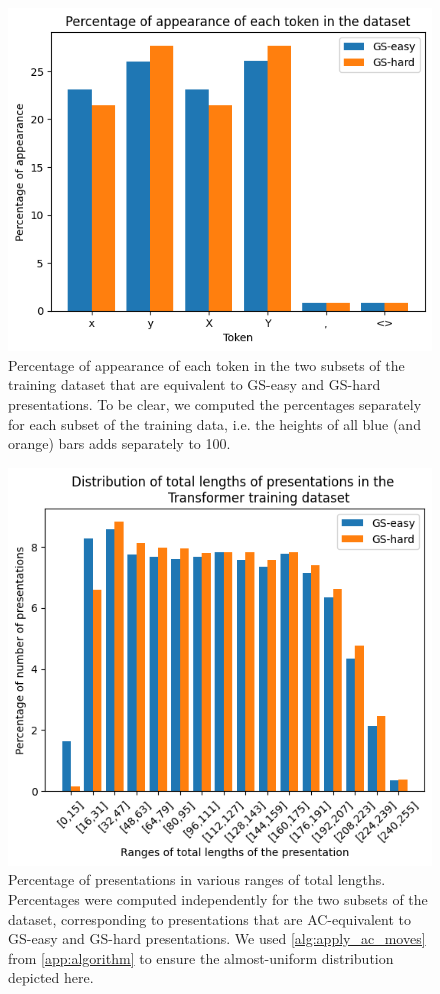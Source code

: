 \begin{figure}
	\centering
	\includegraphics[scale=0.6]{fig/tokens_hist.png}
	\caption{Percentage of appearance of each token in the two subsets of the training dataset that are equivalent to GS-easy and GS-hard presentations. To be clear, we computed the percentages separately for each subset of the training data, i.e. the heights of all blue (and orange) bars adds separately to 100.}
	\label{fig:tokens_hist}
\end{figure}


\begin{figure}
	\centering
	\includegraphics[scale=0.6]{fig/gpt_data_length_distribution.png}
	\caption{Percentage of presentations in various ranges of total lengths. Percentages were computed independently for the two subsets of the dataset, corresponding to presentations that are AC-equivalent to GS-easy and GS-hard presentations. We used \autoref{alg:apply_ac_moves} from \autoref{app:algorithm} to ensure the almost-uniform distribution depicted here.}
	\label{fig:gpt_data}
\end{figure}




